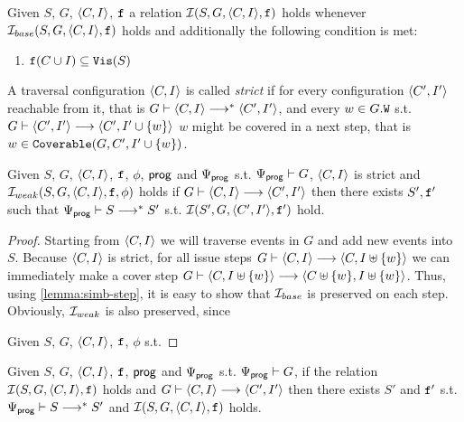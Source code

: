 \documentclass[12pt]{article}
\begin{document}
\begin{definition}
  Given $S$, $G$, $\langle C, I \rangle$, ${\mathtt{f}}$ a relation $\mathcal{I}(S, G, \langle C, I \rangle, {\mathtt{f}})$ holds
  whenever $\mathcal{I}_{base}(S, G, \langle C, I \rangle, {\mathtt{f}})$ holds and additionally
  the following condition is met:
  \begin{enumerate}[label=\textbf{S.\arabic*},start=8]
    \item \label{item:sim-vis}
       ${\mathtt{f}}(C \cup I) \subseteq {\mathtt{Vis}}(S)$
  \end{enumerate}
\end{definition}

\begin{definition}
  A traversal configuration $\langle C, I \rangle$ is called \emph{strict}
  if for every configuration $\langle C', I' \rangle$ reachable from it,
  that is $G \vdash \langle C, I \rangle \longrightarrow^* \langle C', I' \rangle$,
  and every $w \in G.{\mathtt{W}}$ s.t.
  $G \vdash \langle C', I' \rangle \longrightarrow \langle C', I' \cup \{w\} \rangle$
  $w$ might be covered in a next step, that is
  $w \in {\mathtt{Coverable}}(G, C', I' \cup \{w\})$.
\end{definition}

\begin{lemma}
  \label{lemma:simw-finite}
  Given $S$, $G$, $\langle C, I \rangle$, ${\mathtt{f}}$, $\phi$, $\mathsf{prog}$ and $\Psi_{\mathsf{prog}}$
  s.t. $\Psi_{\mathsf{prog}} \vdash G$, $\langle C, I \rangle$ is strict
  and $\mathcal{I}_{weak}(S, G, \langle C, I \rangle, {\mathtt{f}}, \phi)$ holds
  if $G \vdash \langle C, I \rangle \longrightarrow \langle C', I' \rangle$ then
  there exists $S', {\mathtt{f}}'$ such that
  $\Psi_{\mathsf{prog}} \vdash S \longrightarrow^* S'$ s.t.
  $\mathcal{I}(S', G, \langle C', I' \rangle, {\mathtt{f}}')$ hold.
\end{lemma}

\begin{proof}
  Starting from $\langle C, I \rangle$ we will traverse events in $G$
  and add new events into $S$.
  Because $\langle C, I \rangle$ is strict, for all issue steps
  $G \vdash \langle C, I \rangle \longrightarrow \langle C, I \uplus \{w\} \rangle$
  we can immediately make a cover step
  $G \vdash \langle C, I \uplus \{w\} \rangle \longrightarrow \langle C \uplus \{w\}, I \uplus \{w\} \rangle$.
  Thus, using \ref{lemma:simb-step}, it is easy to show that $\mathcal{I}_{base}$
  is preserved on each step.
  Obviously, $\mathcal{I}_{weak}$ is also preserved, since 
  
  Given $S$, $G$, $\langle C, I \rangle$, ${\mathtt{f}}$, $\phi$ s.t. 
\end{proof}

\begin{lemma}
  Given $S$, $G$, $\langle C, I \rangle$, ${\mathtt{f}}$, $\mathsf{prog}$ and $\Psi_{\mathsf{prog}}$
  s.t. $\Psi_{\mathsf{prog}} \vdash G$,
  if the relation $\mathcal{I}(S, G, \langle C, I \rangle, {\mathtt{f}})$ holds
  and $G \vdash \langle C, I \rangle \longrightarrow \langle C', I' \rangle$
  then there exists $S'$ and ${\mathtt{f}}'$ s.t.
  $\Psi_{\mathsf{prog}} \vdash S \longrightarrow^* S'$ and
  $\mathcal{I}(S, G, \langle C, I \rangle, {\mathtt{f}})$ holds.
\end{lemma}
\end{document}
